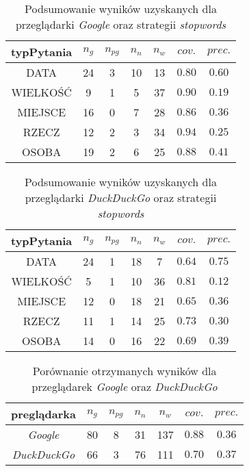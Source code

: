 \begin{table}[h]
	\centering
	\begin{tabular}{|c|c|c|c|c|c|c| }
	
	\hline
	\textbf{typPytania} & $n_g$ &$n_{pg}$&$n_n$&$n_w$&$cov.$&$prec.$  \\ \hline
	DATA&24&3&10&13&$\num{0.80}$&$\num{0.60}$ \\ \hline
	WIELKOŚĆ&9&1&5&37&$\num{0.90}$&$\num{0.19}$ \\ \hline
	MIEJSCE&16&0&7&28&$\num{0.86}$&$\num{0.36}$ \\ \hline
	RZECZ&12&2&3&34&$\num{0.94}$&$\num{0.25}$\\ \hline
	OSOBA&19&2&6&25&$\num{0.88}$&$\num{0.41}$\\ \hline
	\end{tabular}
	\caption{Podsumowanie wyników uzyskanych dla przeglądarki \textit{Google} oraz strategii \textit{stopwords}}
	
	\label{tab:googleStopwords}
	
\end{table}

\begin{table}[h]
	\centering
	\begin{tabular}{|c|c|c|c|c|c|c| }
		
		\hline
		\textbf{typPytania} & $n_g$ &$n_{pg}$&$n_n$&$n_w$&$cov.$&$prec.$  \\ \hline
		DATA&24&1&18&7&$\num{0.64}$&$\num{0.75}$ \\ \hline
		WIELKOŚĆ&5&1&10&36&$\num{0.81}$&$\num{0.12}$ \\ \hline
		MIEJSCE&12&0&18&21&$\num{0.65}$&$\num{0.36}$ \\ \hline
		RZECZ&11&1&14&25&$\num{0.73}$&$\num{0.30}$\\ \hline
		OSOBA&14&0&16&22&$\num{0.69}$&$\num{0.39}$\\ \hline
	\end{tabular}
	\caption{Podsumowanie wyników uzyskanych dla przeglądarki \textit{DuckDuckGo} oraz strategii \textit{stopwords}}
	
	\label{tab:DuckStopwords}
	
\end{table}

\begin{table}[h]
	\centering
	\begin{tabular}{|c|c|c|c|c|c|c| }
		
		\hline
		\textbf{preglądarka} & $n_g$ &$n_{pg}$&$n_n$&$n_w$&$cov.$&$prec.$  \\ \hline
		\textit{Google}&80&8&31&137&$\num{0.88}$&$\num{0.36}$ \\ \hline
		\textit{DuckDuckGo}&66&3&76&111&$\num{0.70}$&$\num{0.37}$ \\ \hline
	\end{tabular}
	\caption{Porównanie otrzymanych wyników dla przeglądarek \textit{Google} oraz \textit{DuckDuckGo}}
	
	\label{tab:porownanieWysz}
	
\end{table}

